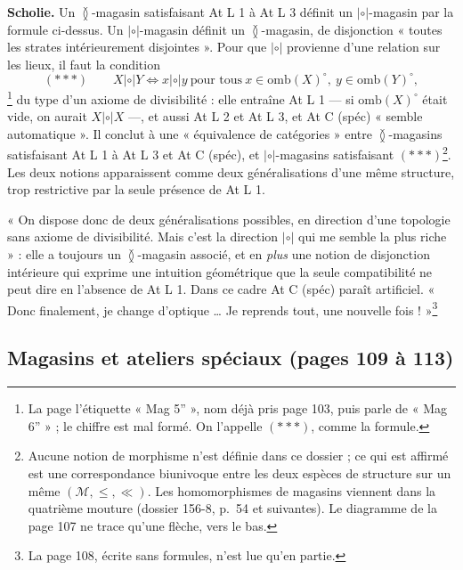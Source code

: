\documentclass[11pt,a4paper]{article}
\begin{document}
\textbf{Scholie.} Un $\between$-magasin satisfaisant At L 1 à At L 3 définit un
$\mathrel{|{\circ}|}$-magasin par la formule ci-dessus. Un
$\mathrel{|{\circ}|}$-magasin définit un $\between$-magasin, de disjonction
« toutes les strates intérieurement disjointes ». Pour que $\mathrel{|{\circ}|}$
provienne d'une relation sur les lieux, il faut la condition
\[
(\ast\ast\ast) \qquad X \mathrel{|{\circ}|} Y \iff x \mathrel{|{\circ}|} y \ \text{pour
tous}\ x \in \mathrm{omb}(X)^{\circ},\ y \in \mathrm{omb}(Y)^{\circ} ,
\]
\footnote{La page l'étiquette « Mag 5'' », nom déjà pris page 103, puis parle de
« Mag 6'' » ; le chiffre est mal formé. On l'appelle $(\ast\ast\ast)$, comme la
formule.}
du type d'un axiome de divisibilité : elle entraîne At L 1 --- si
$\mathrm{omb}(X)^{\circ}$ était vide, on aurait $X \mathrel{|{\circ}|} X$ ---, et
aussi At L 2 et At L 3, et At C (spéc) « semble automatique ». Il conclut à une
« équivalence de catégories » entre $\between$-magasins satisfaisant At L 1 à At L 3
et At C (spéc), et $\mathrel{|{\circ}|}$-magasins satisfaisant
$(\ast\ast\ast)$\footnote{Aucune notion de morphisme n'est définie dans ce dossier
; ce qui est affirmé est une correspondance biunivoque entre les deux espèces de
structure sur un même $(\mathcal{M}, \leq, \ll)$. Les homomorphismes de magasins
viennent dans la quatrième mouture (dossier 156-8, p.~54 et suivantes). Le
diagramme de la page 107 ne trace qu'une flèche, vers le bas.}. Les deux notions
apparaissent comme deux généralisations d'une même structure, trop restrictive par
la seule présence de At L 1.

« On dispose donc de deux généralisations possibles, en direction d'une topologie
sans axiome de divisibilité. Mais c'est la direction $\mathrel{|{\circ}|}$ qui me
semble la plus riche » : elle a toujours un $\between$-magasin associé, et en
\emph{plus} une notion de disjonction intérieure qui exprime une intuition
géométrique que la seule compatibilité ne peut dire en l'absence de At L 1. Dans
ce cadre At C (spéc) paraît artificiel. « Donc finalement, je change d'optique
\ldots{} Je reprends tout, une nouvelle fois ! »\footnote{La page 108, écrite sans
formules, n'est lue qu'en partie.}

\subsection*{Magasins et ateliers spéciaux (pages 109 à 113)}
\end{document}
